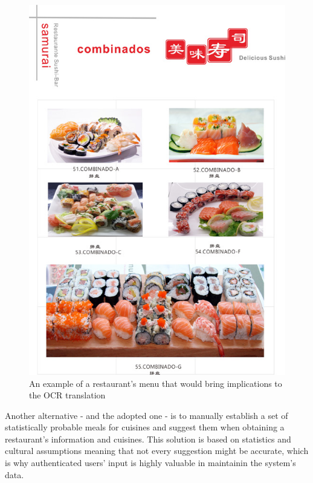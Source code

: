     \begin{figure}[H]
        \begin{center}
            \includegraphics[scale=0.4]{_figures/examplemenu.jpg}
            \caption{An example of a restaurant's menu that would bring implications to the OCR translation}
        \end{center}
    \end{figure}

    Another alternative - and the adopted one - is to manually establish a set of statistically probable meals for cuisines
    and suggest them when obtaining a restaurant's information and cuisines.
    This solution is based on statistics and cultural assumptions meaning that not every suggestion might be accurate, which is
    why authenticated users' input is highly valuable in maintainin the system's data.\\